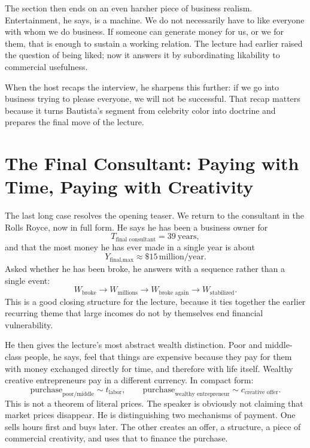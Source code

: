 The section then ends on an even harsher piece of business realism. Entertainment, he says, is a machine. We do not necessarily have to like everyone with whom we do business. If someone can generate money for us, or we for them, that is enough to sustain a working relation. The lecture had earlier raised the question of being liked; now it answers it by subordinating likability to commercial usefulness.

When the host recaps the interview, he sharpens this further: if we go into business trying to please everyone, we will not be successful. That recap matters because it turns Bautista's segment from celebrity color into doctrine and prepares the final move of the lecture.

\section{The Final Consultant: Paying with Time, Paying with Creativity}

The last long case resolves the opening teaser. We return to the consultant in the Rolls Royce, now in full form. He says he has been a business owner for
\begin{equation}
T_{\text{final consultant}} = 39\ \text{years},
\end{equation}
and that the most money he has ever made in a single year is about
\begin{equation}
Y_{\text{final,max}} \approx \$15\,\text{million/year}.
\end{equation}
Asked whether he has been broke, he answers with a sequence rather than a single event:
\begin{equation}
W_{\text{broke}}
\to
W_{\text{millions}}
\to
W_{\text{broke again}}
\to
W_{\text{stabilized}}.
\end{equation}
This is a good closing structure for the lecture, because it ties together the earlier recurring theme that large incomes do not by themselves end financial vulnerability.

He then gives the lecture's most abstract wealth distinction. Poor and middle-class people, he says, feel that things are expensive because they pay for them with money exchanged directly for time, and therefore with life itself. Wealthy creative entrepreneurs pay in a different currency. In compact form:
\begin{equation}
\text{purchase}_{\text{poor/middle}}
\sim t_{\text{labor}},
\qquad
\text{purchase}_{\text{wealthy entrepreneur}}
\sim c_{\text{creative offer}}.
\end{equation}
This is not a theorem of literal prices. The speaker is obviously not claiming that market prices disappear. He is distinguishing two mechanisms of payment. One sells hours first and buys later. The other creates an offer, a structure, a piece of commercial creativity, and uses that to finance the purchase.

